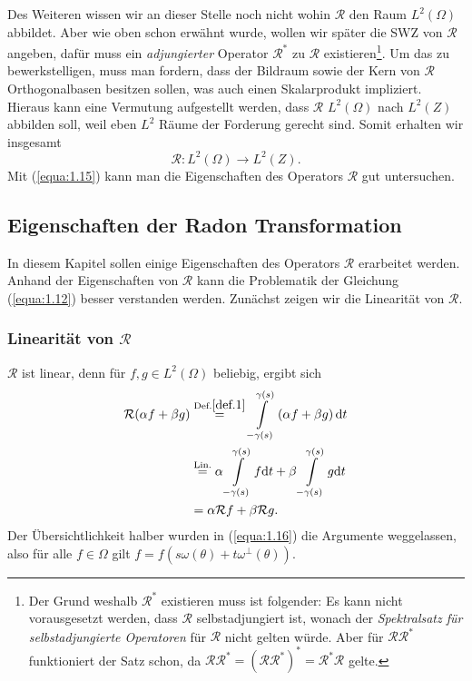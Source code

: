 Des Weiteren  wissen wir an dieser Stelle noch nicht wohin $\mathcal{R}$ den Raum $L^2(\Omega)$ abbildet. Aber wie oben schon erwähnt wurde, wollen wir später die SWZ von $\mathcal{R}$ angeben, dafür muss ein \textit{adjungierter} Operator $\mathcal{R^*}$ zu $\mathcal{R}$ existieren\footnote{\label{foot:5} Der Grund weshalb $\mathcal{R^*}$ existieren muss ist folgender: Es kann nicht vorausgesetzt werden, dass $\mathcal{R}$ selbstadjungiert ist, wonach der \textit{Spektralsatz für selbstadjungierte Operatoren} für $\mathcal{R}$ nicht gelten würde. Aber für $\mathcal{R}\mathcal{R^*}$ funktioniert der Satz schon, da $\mathcal{R}\mathcal{R^*} = (\mathcal{R}\mathcal{R^*})^* = \mathcal{R^*}\mathcal{R}$ gelte.}. Um das zu bewerkstelligen, muss man fordern, dass der Bildraum sowie der Kern von $\mathcal{R}$ Orthogonalbasen besitzen sollen, was auch einen Skalarprodukt impliziert. Hieraus kann eine Vermutung aufgestellt werden, dass $\mathcal{R}$ $L^2(\Omega)$ nach $L^2(Z)$ abbilden soll, weil eben $L^2$ Räume der Forderung gerecht sind. Somit erhalten wir insgesamt
\begin{equation}
	\mathcal{R} : L^2(\Omega) \rightarrow L^2(Z).
	\label{equa:1.15}
\end{equation}
Mit (\ref{equa:1.15}) kann man die Eigenschaften des Operators $\mathcal{R}$ gut untersuchen.

\subsection*{Eigenschaften der Radon Transformation}
\label{cha:1.2.2}

In diesem Kapitel sollen einige Eigenschaften des Operators $\mathcal{R}$ erarbeitet werden. Anhand der Eigenschaften von $\mathcal{R}$ kann die Problematik der Gleichung (\ref{equa:1.12}) besser verstanden werden. Zunächst zeigen wir die Linearität von $\mathcal{R}$. 
\subsubsection{Linearität von $\mathcal{R}$}
$\mathcal{R}$ ist linear, denn für $f, g \in L^2(\Omega)$ beliebig,  ergibt sich 
\begin{equation}
	\begin{split}
		\mathcal{R}( \alpha f + \beta g) & \stackrel{\mbox{\scriptsize Def.}\ref{def.1}}{=}  \int\limits_{-\gamma(s)}^{\gamma(s)} \left( \alpha f + \beta g\right ) \mbox{d}t\\
		& \stackrel{\mbox{\scriptsize Lin.}}{=} \alpha \int\limits_{-\gamma(s)}^{\gamma(s)} f\mbox{d}t  +  \beta \int\limits_{-\gamma(s)}^{\gamma(s)} g \mbox{d}t\\
		& = \alpha \mathcal{R} f +  \beta \mathcal{R} g .
	\end{split}
	\label{equa:1.16}
\end{equation}
Der Übersichtlichkeit halber wurden in (\ref{equa:1.16}) die Argumente weggelassen, also für alle $f \in \Omega$ gilt $f = f(s\omega(\theta) + t\omega^{\perp}(\theta))$.

